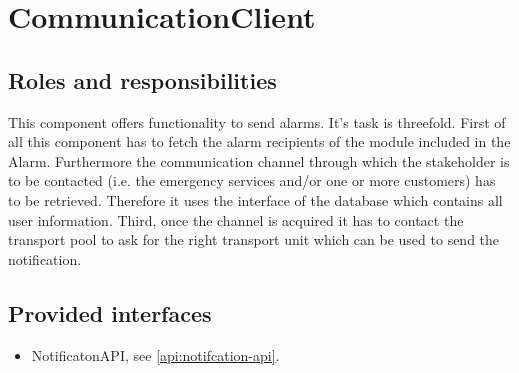 \section{CommunicationClient}
\label{element:communication-client}

\subsection{Roles and responsibilities}

\npar This component offers functionality to send alarms. It's task is
threefold. First of all this component has to fetch the alarm recipients of the
module included in the Alarm. Furthermore the communication channel through
which the stakeholder is to be contacted (i.e. the emergency services and/or one
or more customers) has to be retrieved. Therefore it uses the
 interface of the database which contains all user
information. Third, once the channel is acquired it has to contact the
transport pool to ask for the right transport unit which can be used to send the
notification.

\subsection{Provided interfaces}

\begin{itemize}
  \item NotificatonAPI, see \ref{api:notifcation-api}.
\end{itemize}